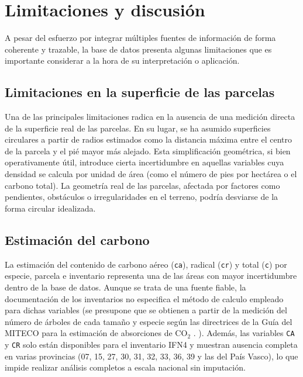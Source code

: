 \section{Limitaciones y discusión}



A pesar del esfuerzo por integrar múltiples fuentes de información de forma coherente y trazable, la base de datos presenta algunas limitaciones que es importante considerar a la hora de su interpretación o aplicación.

\subsection*{Limitaciones en la superficie de las parcelas}

Una de las principales limitaciones radica en la ausencia de una medición directa de la superficie real de las parcelas. En su lugar, se ha asumido superficies circulares a partir de radios estimados como la distancia máxima entre el centro de la parcela y el pié mayor más alejado. Esta simplificación geométrica, si bien operativamente útil, introduce cierta incertidumbre en aquellas variables cuya densidad se calcula por unidad de área (como el número de pies por hectárea o el carbono total). La geometría real de las parcelas, afectada por factores como pendientes, obstáculos o irregularidades en el terreno, podría desviarse de la forma circular idealizada.

\subsection*{Estimación del carbono}

La estimación del contenido de carbono aéreo (\texttt{ca}), radical (\texttt{cr}) y total (\texttt{c}) por especie, parcela e inventario representa una de las áreas con mayor incertidumbre dentro de la base de datos. Aunque se trata de una fuente fiable, la documentación de los inventarios no especifica el método de calculo empleado para dichas variables (se presupone que se obtienen a partir de la medición del número de árboles de cada tamaño y especie según las directrices de la Guía del MITECO para la estimación de absorciones de CO$_2$ \cite{miteco_guia_co2}. ). Además, las variables \texttt{CA} y \texttt{CR} solo están disponibles para el inventario IFN4 y muestran ausencia completa en varias provincias (07, 15, 27, 30, 31, 32, 33, 36, 39 y las del País Vasco), lo que impide realizar análisis completos a escala nacional sin imputación.  
\medskip

